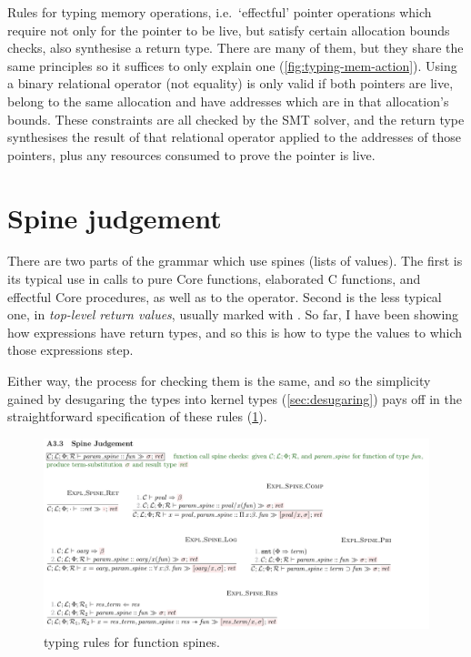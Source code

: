 Rules for typing memory operations, i.e.\ `effectful' pointer operations which
require not only for the pointer to be live, but satisfy certain allocation
bounds checks, also synthesise a return type. There are many of them, but they
share the same principles so it suffices to only explain one
(\cref{fig:typing-mem-action}).
Using a binary relational operator (not equality) is only valid if both
pointers are live, belong to the same allocation and have addresses which are
in that allocation's bounds. These constraints are all checked by the SMT
solver, and the return type synthesises the result of that relational operator
applied to the addresses of those pointers, plus any resources consumed to
prove the pointer is live.

\section{Spine judgement}

There are two parts of the grammar which use spines (lists of values). The first
is its typical use in calls to pure Core functions, elaborated C functions, and
effectful Core procedures, as well as to the  %
operator. Second is the less typical one, in \emph{top-level return values},
usually marked with . So far, I have been showing %
how expressions have return types, and so this is how to type the values to
which those expressions step.

Either way, the process for checking them is the same, and so the simplicity
gained by desugaring the  types into kernel types
(\cref{sec:desugaring}) pays off in the straightforward specification of these
rules (\cref{fig:typing-spine}).

\begin{figure}[tp]
    \includegraphics{figures/kernel-spine-typing}
    \caption{ typing rules for function
        spines.}\label{fig:typing-spine}
\end{figure}

